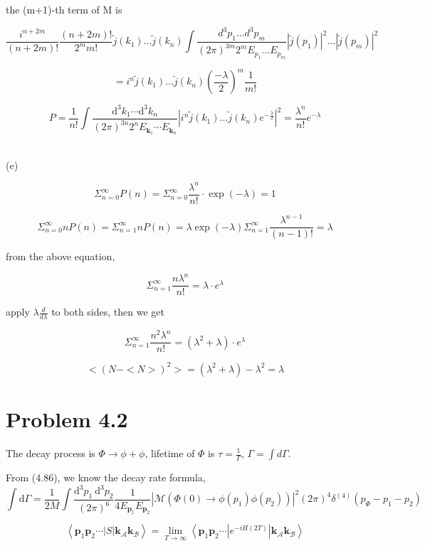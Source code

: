 \documentclass[11pt]{article} %
\begin{document}
the (m+1)-th term of M is 

\[
    \frac{i^{n+2m}}{(n+2m)!} \frac{(n+2m)!}{2^m m!} \tilde{j}(k_1) ... \tilde{j}(k_n) \int \frac{d^3 p_1 ... d^3 p_m}{(2\pi)^{3m} 2^m E_{p_1} ... E_{p_m}} |\tilde{j}(p_1)|^2 ... |\tilde{j}(p_m)|^2    
\]

\[
    = i^n\tilde{j}(k_1) ... \tilde{j}(k_n) (\frac{- \lambda}{2})^m \frac{1}{m!}    
\]

\[
    P = \frac{1}{n!} \int \frac{\mathrm{d}^{3} k_{1} \cdots \mathrm{d}^{3} k_{n}}{(2 \pi)^{3 n} 2^{n} E_{\mathbf{k}_{1}} \cdots E_{\mathbf{k}_{n}}} |i^n \tilde{j}(k_1) ... \tilde{j}(k_n) e^{-\frac{\lambda}{2}}|^2 = \frac{\lambda^n}{n!} e^{-\lambda}       
\]

~\\
\noindent (e)

\[
    \Sigma_{n=0}^{\infty} P(n) = \Sigma_{n=0}^{\infty} \frac{\lambda^n}{n!} \cdot \exp(-\lambda) = 1    
\]

\[
    \Sigma_{n=0}^{\infty} n P(n) = \Sigma_{n=1}^{\infty} n P(n) = \lambda \exp(-\lambda) \Sigma_{n=1}^{\infty} \frac{\lambda^{n-1}}{(n-1)!} = \lambda       
\]

from the above equation,

\[
    \Sigma_{n=1}^{\infty} \frac{n \lambda^n}{n!} = \lambda \cdot e^{\lambda}    
\]

apply $\lambda \frac{d}{d \lambda}$ to both sides, then we get 

\[
    \Sigma_{n=1}^{\infty} \frac{n^2 \lambda^n}{n!} = (\lambda^2 + \lambda) \cdot e^{\lambda}      
\]

\[
    <(N - <N>)^2> = (\lambda^2 + \lambda) - \lambda^2 = \lambda    
\]

\section{Problem 4.2}

The decay process is $\Phi \to \phi + \phi$, lifetime of $\Phi$ is $\tau = \frac{1}{\Gamma}$, $\Gamma = \int d\Gamma$.

\noindent From (4.86), we know the decay rate formula,
\[
    \int \mathrm{d} \Gamma=\frac{1}{2 M} \int \frac{\mathrm{d}^{3} p_{1} \mathrm{~d}^{3} p_{2}}{(2 \pi)^{6}} \frac{1}{4 E_{\mathbf{p}_{1}} E_{\mathbf{p}_{2}}}\left|\mathcal{M}\left(\Phi(0) \rightarrow \phi\left(p_{1}\right) \phi\left(p_{2}\right)\right)\right|^{2}(2 \pi)^{4} \delta^{(4)}\left(p_{\Phi}-p_{1}-p_{2}\right)
\]

\[
    \left\langle\mathbf{p}_{1} \mathbf{p}_{2} \cdots|S| \mathbf{k}_{\mathcal{A}} \mathbf{k}_{\mathcal{B}}\right\rangle=\lim _{T \rightarrow \infty}\left\langle\mathbf{p}_{1} \mathbf{p}_{2} \cdots\left|e^{-i H(2 T)}\right| \mathbf{k}_{\mathcal{A}} \mathbf{k}_{\mathcal{B}}\right\rangle    
\]
\end{document}
